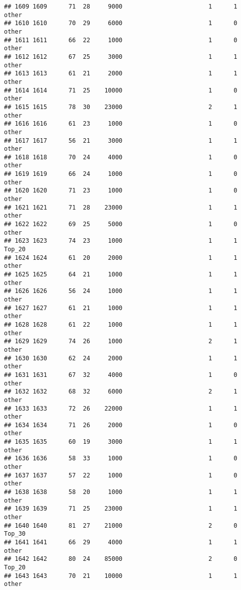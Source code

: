 \documentclass[
]{article}
\begin{document}
\begin{verbatim}
## 1609 1609      71  28     9000                        1      1    other
## 1610 1610      70  29     6000                        1      0    other
## 1611 1611      66  22     1000                        1      0    other
## 1612 1612      67  25     3000                        1      1    other
## 1613 1613      61  21     2000                        1      1    other
## 1614 1614      71  25    10000                        1      0    other
## 1615 1615      78  30    23000                        2      1    other
## 1616 1616      61  23     1000                        1      0    other
## 1617 1617      56  21     3000                        1      1    other
## 1618 1618      70  24     4000                        1      0    other
## 1619 1619      66  24     1000                        1      0    other
## 1620 1620      71  23     1000                        1      0    other
## 1621 1621      71  28    23000                        1      1    other
## 1622 1622      69  25     5000                        1      0    other
## 1623 1623      74  23     1000                        1      1   Top_20
## 1624 1624      61  20     2000                        1      1    other
## 1625 1625      64  21     1000                        1      1    other
## 1626 1626      56  24     1000                        1      1    other
## 1627 1627      61  21     1000                        1      1    other
## 1628 1628      61  22     1000                        1      1    other
## 1629 1629      74  26     1000                        2      1    other
## 1630 1630      62  24     2000                        1      1    other
## 1631 1631      67  32     4000                        1      0    other
## 1632 1632      68  32     6000                        2      1    other
## 1633 1633      72  26    22000                        1      1    other
## 1634 1634      71  26     2000                        1      0    other
## 1635 1635      60  19     3000                        1      1    other
## 1636 1636      58  33     1000                        1      0    other
## 1637 1637      57  22     1000                        1      0    other
## 1638 1638      58  20     1000                        1      1    other
## 1639 1639      71  25    23000                        1      1    other
## 1640 1640      81  27    21000                        2      0   Top_30
## 1641 1641      66  29     4000                        1      1    other
## 1642 1642      80  24    85000                        2      0   Top_20
## 1643 1643      70  21    10000                        1      1    other

\end{verbatim}
\end{document}
